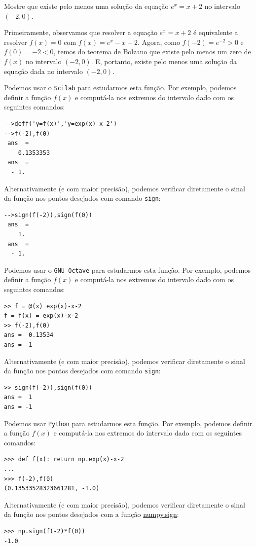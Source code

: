 \begin{ex}\label{ex:teorema_de_Bolzano}
Mostre que existe pelo menos uma solução da equação $e^x=x+2$ no intervalo $(-2,0)$.
\end{ex}
\begin{sol}
Primeiramente, observamos que resolver a equação $e^x = x+2$ é equivalente a resolver $f(x) = 0$ com $f(x)=e^x-x-2$. Agora, como $f(-2)=e^{-2}>0$ e $f(0)=-2<0$, temos do teorema de Bolzano que existe pelo menos um zero de $f(x)$ no intervalo $(-2, 0)$. E, portanto, existe pelo menos uma solução da equação dada no intervalo $(-2, 0)$.

\ifisscilab
Podemos usar o \verb+Scilab+ para estudarmos esta função. Por exemplo, podemos definir a função $f(x)$ e computá-la nos extremos do intervalo dado com os seguintes comandos:
\begin{verbatim}
-->deff('y=f(x)','y=exp(x)-x-2')
-->f(-2),f(0)
 ans  =
    0.1353353
 ans  =
  - 1.
\end{verbatim}
Alternativamente (e com maior precisão), podemos verificar diretamente o sinal da função nos pontos desejados com comando \verb+sign+:
\begin{verbatim}
-->sign(f(-2)),sign(f(0))
 ans  =
    1.
 ans  =
  - 1.
\end{verbatim}
\fi
\ifisoctave
Podemos usar o \verb+GNU Octave+ para estudarmos esta função. Por exemplo, podemos definir a função $f(x)$ e computá-la nos extremos do intervalo dado com os seguintes comandos:
\begin{verbatim}
>> f = @(x) exp(x)-x-2
f = f(x) = exp(x)-x-2
>> f(-2),f(0)
ans =  0.13534
ans = -1
\end{verbatim}
Alternativamente (e com maior precisão), podemos verificar diretamente o sinal da função nos pontos desejados com comando \verb+sign+:
\begin{verbatim}
>> sign(f(-2)),sign(f(0))
ans =  1
ans = -1
\end{verbatim}
\fi
\ifispython
Podemos usar \verb+Python+ para estudarmos esta função. Por exemplo, podemos definir a função $f(x)$ e computá-la nos extremos do intervalo dado com os seguintes comandos:
\begin{verbatim}
>>> def f(x): return np.exp(x)-x-2
...
>>> f(-2),f(0)
(0.13533528323661281, -1.0)
\end{verbatim}
Alternativamente (e com maior precisão), podemos verificar diretamente o sinal da função nos pontos desejados com a função \href{https://docs.scipy.org/doc/numpy/reference/generated/numpy.sign.html?highlight=numpy.sign#numpy.sign}{numpy.sign}:
\begin{verbatim}
>>> np.sign(f(-2)*f(0))
-1.0
\end{verbatim}
\fi
\end{sol}



